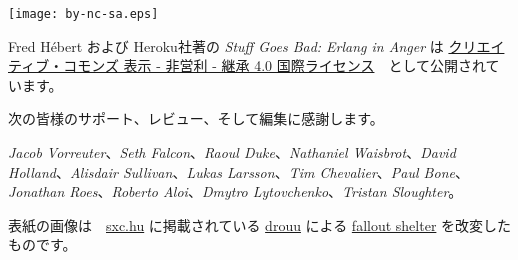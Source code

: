 \clearpage
\thispagestyle{fancy}

\fancyhf{} %
\renewcommand{\headrulewidth}{0pt} %
\renewcommand{\footrulewidth}{0pt}

\vspace*{\fill}


\begin{center}
\texttt{[image: by-nc-sa.eps]}
\end{center}

\begin{center}
Fred Hébert および Heroku社著の \emph{Stuff Goes Bad: Erlang in Anger} は \href{http://creativecommons.org/licenses/by-nc-sa/4.0/}{クリエイティブ・コモンズ 表示 - 非営利 - 継承 4.0 国際ライセンス}　として公開されています。
\end{center}

次の皆様のサポート、レビュー、そして編集に感謝します。

\emph{Jacob Vorreuter}、\emph{Seth Falcon}、\emph{Raoul Duke}、\emph{Nathaniel Waisbrot}、\emph{David Holland}、\emph{Alisdair Sullivan}、\emph{Lukas Larsson}、\emph{Tim Chevalier}、\emph{Paul Bone}、\emph{Jonathan Roes}、\emph{Roberto Aloi}、\emph{Dmytro Lytovchenko}、\emph{Tristan Sloughter}。

\null
\vfill
表紙の画像は　\href{http://sxc.hu}{sxc.hu} に掲載されている \href{http://www.freeimages.com/profile/drouu}{drouu} による \href{http://www.freeimages.com/photo/533163}{fallout shelter} を改変したものです。


